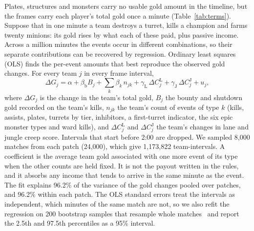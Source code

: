 Plates, structures and monsters carry no usable gold amount in the timeline, but the frames carry
each player's total gold once a minute (Table~\ref{tab:terms}). Suppose that in one minute a team
destroys a turret, kills a champion and farms twenty minions: its gold rises by what each of these
paid, plus passive income. Across a million minutes the events occur in different combinations, so
their separate contributions can be recovered by regression. Ordinary least squares (OLS) finds the
per-event amounts that best reproduce the observed gold changes. For every team $j$ in every
frame interval,
\begin{equation}\label{eq:label-prices}
\Delta G_j = \alpha + \beta_{\mathrm{b}} B_j + \sum_{k} \beta_k\, n_{jk}
 + \gamma_{\mathrm{L}}\, \Delta C^{\mathrm{L}}_j + \gamma_{\mathrm{J}}\, \Delta C^{\mathrm{J}}_j + u_j,
\end{equation}
where $\Delta G_j$ is the change in the team's total gold, $B_j$ the bounty and shutdown gold
recorded on the team's kills, $n_{jk}$ the team's count of events of type $k$ (kills, assists,
plates, turrets by tier, inhibitors, a first-turret indicator, the six epic monster types and ward
kills), and $\Delta C^{\mathrm{L}}_j$ and $\Delta C^{\mathrm{J}}_j$ the team's changes in lane and
jungle creep score. Intervals that start before 2:00 are dropped. We sampled 8,000 matches from each patch (24,000), which give 1,173,822 team-intervals.
A coefficient is the average team gold associated with one more event of its type when the other
counts are held fixed. It is not the payout written in the rules, and it absorbs any income that
tends to arrive in the same minute as the event. The fit explains 96.2\% of the variance of the gold
changes pooled over patches, and 96.2\% within each patch. The OLS standard errors treat the
intervals as independent, which minutes of the same match are not, so we also refit the regression
on 200 bootstrap samples that resample whole matches~\cite{efron1993bootstrap} and report the
2.5th and 97.5th percentiles as a 95\% interval.

